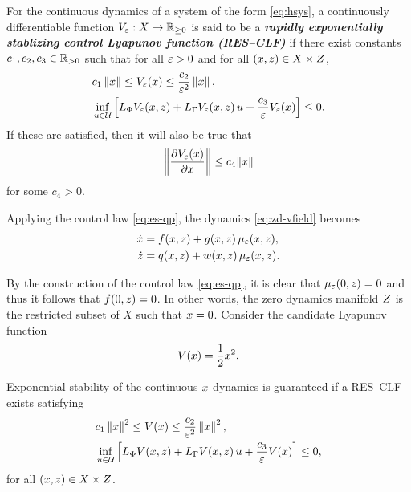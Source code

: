 \documentclass[twocolumn]{article}
\begin{document}
\begin{definition}
  For the continuous dynamics of a system of the form \eqref{eq:hsys}, a continuously differentiable function $V_{\varepsilon} : X \to \mathbb{R}_{\geq 0}$ is said to be a {\bf \em rapidly exponentially stablizing control Lyapunov function (RES--CLF)} if there exist constants $c_{1}, c_{2}, c_{3} \in \mathbb{R}_{> 0}$ such that for all $\varepsilon > 0$ and for all $(x, z) \in X \times Z$,
  \begin{align}
    &c_{1} \left\|x\right\| \leq V_{\varepsilon}(x) \leq \frac{c_{2}}{\varepsilon^{2}} \left\|x\right\|,\\
    \nonumber
    &\inf_{u \in \mathcal{U}} \left[ L_{\Phi} V_{\varepsilon}(x, z) + L_{\Gamma} V_{\varepsilon}(x, z) \, u + \frac{c_{3}}{\varepsilon} V_{\varepsilon}(x) \right] \leq 0.
  \end{align}
  If these are satisfied, then it will also be true that
  \begin{align}
    \label{eq:dVedx-bounds}
    \left\| \frac{\partial{V_{\varepsilon}(x)}}{\partial{x}} \right\| \leq c_{4} \| x \|
  \end{align}
  for some $c_{4} > 0$.
\end{definition}

Applying the control law \eqref{eq:es-qp}, the dynamics \eqref{eq:zd-vfield} becomes
\begin{align}
  \nonumber
  \dot {x} &= f(x, z) + g(x, z) \, \mu_{\varepsilon}(x, z),\\
  \dot {z} &= q(x, z) + w(x, z) \, \mu_{\varepsilon}(x, z).
  \label{eq:zd-vfield-cl}
\end{align}

By the construction of the control law \eqref{eq:es-qp}, it is clear that $\mu_{\varepsilon}(0, z) = 0$ and thus it follows that $f(0, z) = 0$.
%
In other words, the zero dynamics manifold $Z$ is the restricted subset of $X$ such that $x = 0$.
%
Consider the candidate Lyapunov function
\begin{align}
  V(x) = \frac{1}{2} x^{2}.
\end{align}

\begin{proposition}  
  \label{prop:res-clf}
  Exponential stability of the continuous $x$ dynamics is guaranteed if a RES--CLF exists satisfying
  \begin{align}
    \label{eq:lyap-cond-nrg-es}
    &c_{1} \left\|x\right\|^{2} \leq V(x) \leq \frac{c_{2}}{\varepsilon^{2}} \left\|x\right\|^2,\\
    \nonumber
    &\inf_{u \in \mathcal{U}} \left[ L_{\Phi} V(x, z) + L_{\Gamma} V(x, z) \, u + \frac{c_{3}}{\varepsilon} V(x) \right] \leq 0,
  \end{align}
  for all $(x, z) \in X \times Z$.
\end{proposition}
\end{document}
